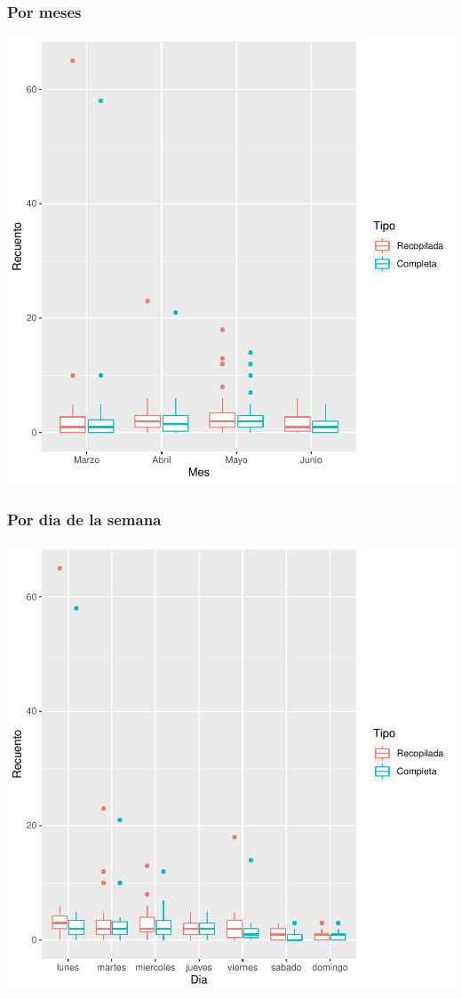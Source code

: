 \documentclass{article}
\begin{document}
\subsubsection{Por meses}

\includegraphics{seguimento2-038}

\subsubsection{Por dia de la semana}

\includegraphics{seguimento2-039}
\end{document}
